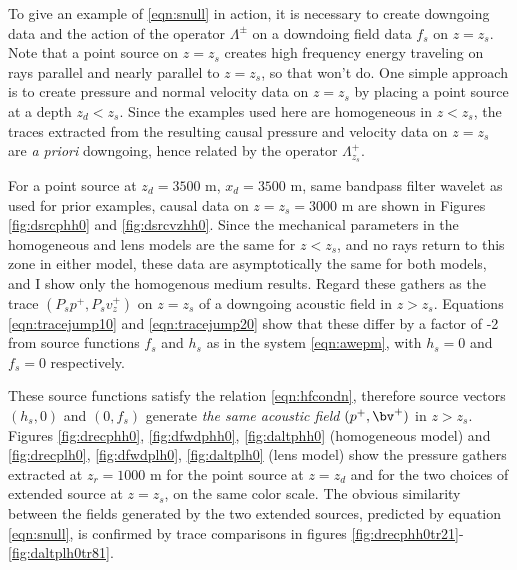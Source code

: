 To give an example of \ref{eqn:snull} in action, it is necessary to
create downgoing data and the action of the operator $\Lambda^{\pm}$
on a downdoing field data $f_s$ on $z=z_s$. Note that a point source
on $z=z_s$ creates high frequency energy traveling on rays parallel
and nearly parallel to $z=z_s$, so that won't do. One simple approach
is to create pressure and normal velocity data on $z=z_s$ by placing a
point source at a depth $z_d<z_s$. Since the examples used here are
homogeneous in $z<z_s$, the traces extracted from the resulting
causal pressure and velocity data on $z=z_s$ are {\em a priori}
downgoing, hence related by the operator $\Lambda^+_{z_s}$.

For a point source at $z_d=3500$ m, $x_d=3500$ m, same bandpass filter
wavelet as used for prior examples, causal data on $z=z_s=3000$ m are
shown in Figures \ref{fig:dsrcphh0} and \ref{fig:dsrcvzhh0}. Since the
mechanical parameters in the homogeneous and lens models are the same
for $z<z_s$, and no rays return to this zone in either model, these
data are asymptotically the same for both models, and I show only the
homogenous medium results. Regard these gathers as the trace
$(P_sp^+,P_sv^+_z)$ on $z=z_s$ of a downgoing acoustic field in $z>z_s$.
Equations \ref{eqn:tracejump10} and
\ref{eqn:tracejump20} show that these differ by a factor of -2 from
source functions $f_s$ and $h_s$ as in the system \ref{eqn:awepm},
with $h_s=0$ and $f_s=0$ respectively.

These source functions satisfy
the relation \ref{eqn:hfcondn}, therefore source vectors $(h_s,0)$ and
$(0, f_s)$ generate {\em the same acoustic field} $(p^+,\bv^+)$ in $z>z_s$. Figures
\ref{fig:drecphh0}, \ref{fig:dfwdphh0}, \ref{fig:daltphh0} (homogeneous model) and
\ref{fig:drecplh0}, \ref{fig:dfwdplh0}, \ref{fig:daltplh0} (lens model) show the pressure
gathers extracted at $z_r=1000$ m for the point source at $z=z_d$ and
for the two choices of extended source at $z=z_s$, on the same color
scale. The obvious similarity between the fields generated by the two
extended sources,
predicted by equation \ref{eqn:snull}, is confirmed by trace
comparisons in figures \ref{fig:drecphh0tr21}-\ref{fig:daltplh0tr81}.



